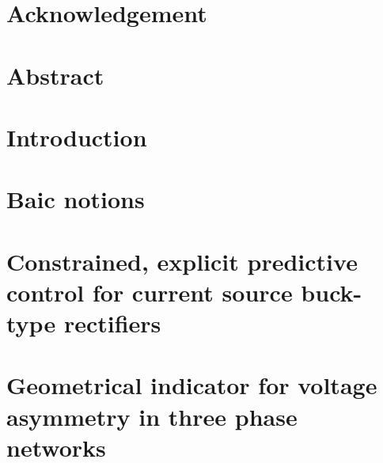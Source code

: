 \documentclass[12pt, a4paper, oneside, table]{report}
\begin{document}

 \null
 \thispagestyle{empty}%
 \addtocounter{page}{-1}%
 \newpage

 

 

 \chapter*{Acknowledgement}
 

% 

 \chapter*{Abstract}
 

 \thispagestyle{plain}
 \tableofcontents
 \newpage

\chapter{Introduction}
 
 
 

 \chapter{Baic notions}

 
 

 \chapter{Constrained, explicit predictive control for current source buck-type rectifiers}
 
 \chapter{Geometrical indicator for voltage asymmetry in three phase networks}
 
\end{document}
